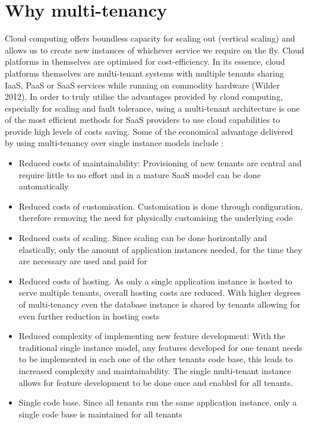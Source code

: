 \section{Why multi-tenancy}
Cloud computing offers boundless capacity for scaling out (vertical scaling) and allows us to create new instances of whichever service we require on the fly. Cloud platforms in themselves are optimised for cost-efficiency. In its essence, cloud platforms themselves are multi-tenant systems with multiple tenants sharing IaaS, PaaS or SaaS services while running on commodity hardware (Wilder 2012). In order to truly utilise the advantages provided by cloud computing, especially for scaling and fault tolerance, using a multi-tenant architecture is one of the most efficient methods for SaaS providers to use cloud capabilities to provide high levels of costs saving. 
Some of the economical advantage delivered by using multi-tenancy over single instance models include \cite{Betts2012-ad}:


\begin{itemize}
\item Reduced costs of maintainability: Provisioning of new tenants are central and require little to no effort and in a mature SaaS model can be done automatically 
\item Reduced costs of customisation. Customisation is done through configuration, therefore removing the need for physically customising the underlying code 
\item Reduced costs of scaling. Since scaling can be done horizontally and elastically, only the amount of application instances needed, for the time they are necessary are used and paid for
\item Reduced costs of hosting. As only a single application instance is hosted to serve multiple tenants, overall hosting costs are reduced. With higher degrees of multi-tenancy even the database instance is shared by tenants allowing for even further reduction in hosting costs
\item Reduced complexity of implementing new feature development: With the traditional single instance model, any features developed for one tenant needs to be implemented in each one of the other tenants code base, this leads to increased complexity and maintainability. The single multi-tenant instance allows for feature development to be done once and enabled for all tenants. 
\item Single code base. Since all tenants run the same application instance, only a single code base is maintained for all tenants
\end{itemize}

